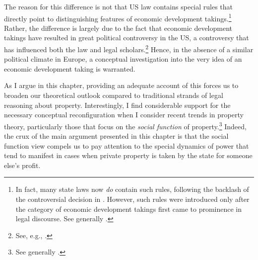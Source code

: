 The reason for this difference is not that US law contains special rules that directly point to distinguishing features of economic development takings.\footnote{In fact, many state laws now {\it do} contain such rules, following the backlash of the controversial decision in \cite{kelo05}. However, such rules were introduced only after the category of economic development takings first came to prominence in legal discourse. See generally \cite{eagle08,somin09,jacobs11}.} Rather, the difference is largely due to the fact that economic development takings have resulted in great political controversy in the US, a controversy that has influenced both the law and legal scholars.\footnote{See, e.g., \cite[1190-1192]{somin08}.} Hence, in the absence of a similar political climate in Europe, a conceptual investigation into the very idea of an economic development taking is warranted.

As I argue in this chapter, providing an adequate account of this forces us to broaden our theoretical outlook compared to traditional strands of legal reasoning about property. Interestingly, I find considerable support for the necessary conceptual reconfiguration when I consider recent trends in property theory, particularly those that focus on the {\it social function} of property.\footnote{See generally \cite{alexander09a,foster11,singer00,underkuffler03,alexander06,alexander10,dagan11}.} Indeed, the crux of the main argument presented in this chapter is that the social function view compels us to pay attention to the special dynamics of power that tend to manifest in cases when private property is taken by the state for someone else's profit.

